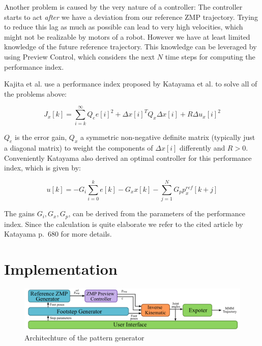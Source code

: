 \documentclass[english,ngerman]{KITreprt}
\begin{document}
Another problem is caused by the very nature of a controller: The
controller starts to act \emph{after} we have a deviation from our
reference ZMP trajectory. Trying to reduce this lag as much as possible
can lead to very high velocities, which might not be realizable by
motors of a robot. However we have at least limited knowledge of the
future reference trajectory. This knowledge can be leveraged by using
Preview Control, which considers the next $N$ time steps for computing
the performance index.

Kajita et al. use a performance index proposed by Katayama et al.
\cite{katayama1985design} to solve all of the problems above:

\begin{equation}
J_x[k] = \sum^{\infty}_{i=k} Q_e e[i]^2 + \Delta x[i]^T Q_x \Delta x[i] + R \Delta u_x[i]^2
\end{equation}

$Q_e$ is the error gain, $Q_x$ a symmetric non-negative definite matrix
(typically just a diagonal matrix) to weight the components of
$\Delta x[i]$ differently and $R > 0$. Conveniently Katayama also
derived an optimal controller for this performance index, which is given
by:

\begin{equation}
u[k] = -G_i \sum^k_{i=0} e[k] - G_x x[k] - \sum^N_{j=1} G_p p^{ref}_x[k + j]
\end{equation}

The gains $G_i, G_x, G_p$, can be derived from the parameters of the
performance index. Since the calculation is quite elaborate we refer to
the cited article by Katayama p.~680 for more details.

\section{Implementation}\label{implementation}

\begin{figure}[tb]
\vspace*{-1em}
\includegraphics[width=\textwidth]{images/pattern_generator_architechture.png}
\caption{Architechture of the pattern generator}
\label{img:pattern-generator-architechture}
\end{figure}
\end{document}

